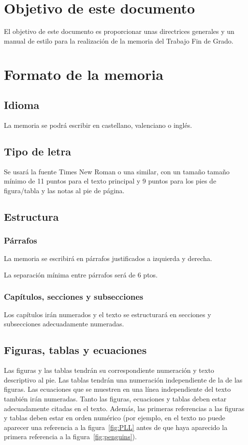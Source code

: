 
\chapter{Objetivo de este documento}
El objetivo de este documento es proporcionar unas directrices generales y un manual de estilo para la realización de la memoria del Trabajo Fin de Grado.
\chapter{Formato de la memoria}
\section{Idioma}
La memoria se podrá escribir en castellano, valenciano o inglés.
\section{Tipo de letra}
Se usará la fuente Times New Roman o una similar, con un tamaño tamaño mínimo de 11 puntos para el texto principal y 9 puntos para los pies de figura/tabla y las notas al pie de página.

\section{Estructura}
\subsection{Párrafos}
La memoria se escribirá en párrafos justificados a izquierda y derecha. 

La separación mínima entre párrafos  será de 6 ptos.
\subsection{Capítulos, secciones y subsecciones}
Los capítulos irán numerados y el texto se estructurará en secciones y subsecciones adecuadamente numeradas.  
\section{Figuras, tablas y ecuaciones}
Las figuras y las tablas tendrán su correspondiente numeración y texto descriptivo al pie. Las tablas tendrán una numeración independiente de la de las figuras.  Las ecuaciones que se muestren en una línea independiente del texto también irán numeradas. Tanto las figuras, ecuaciones y tablas deben estar adecuadamente citadas en el texto. Además, las primeras referencias a las figuras y tablas deben estar en orden numérico (por ejemplo, en el texto no puede aparecer una referencia a la figura~\ref{fig:PLL} antes de que haya aparecido la primera referencia a la figura~\ref{fig:penguins}). 

